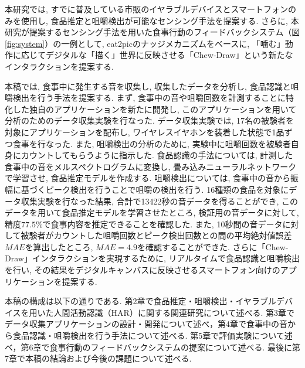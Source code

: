本研究では, すでに普及している市販のイヤラブルデバイスとスマートフォンのみを使用し, 食品推定と咀嚼検出が可能なセンシング手法を提案する. さらに, 本研究が提案するセンシング手法を用いた食事行動のフィードバックシステム（図\ref{fig:system}）の一例として, eat2picのナッジメカニズムをベースに, 「噛む」動作に応じてデジタルな「描く」世界に反映させる「Chew-Draw」という新たなインタラクションを提案する.

本稿では, 食事中に発生する音を収集し, 収集したデータを分析し, 食品認識と咀嚼検出を行う手法を提案する. まず, 食事中の音や咀嚼回数を計測することに特化した独自のアプリケーションを新たに開発し, このアプリケーションを用いて分析のためのデータ収集実験を行なった. データ収集実験では, 17名の被験者を対象にアプリケーションを配布し, ワイヤレスイヤホンを装着した状態で1品ずつ食事を行なった. また, 咀嚼検出の分析のために, 実験中に咀嚼回数を被験者自身にカウントしてもらうように指示した. 食品認識の手法については, 計測した食事中の音をメルスペクトログラムに変換し, 畳み込みニューラルネットワークで学習させ, 食品推定モデルを作成する. 咀嚼検出については, 食事中の音から振幅に基づくピーク検出を行うことで咀嚼の検出を行う. 16種類の食品を対象にデータ収集実験を行なった結果, 合計で13422秒の音データを得ることができ, このデータを用いて食品推定モデルを学習させたところ, 検証用の音データに対して, 精度$77.5\%$で食事内容を推定できることを確認した. また, 10秒間の音データに対して被験者がカウントした咀嚼回数とピーク検出回数との間の平均絶対値誤差$MAE$を算出したところ, $MAE = 4.9$を確認することができた. さらに「Chew-Draw」インタラクションを実現するために, リアルタイムで食品認識と咀嚼検出を行い, その結果をデジタルキャンバスに反映させるスマートフォン向けのアプリケーションを提案する.

本稿の構成は以下の通りである.
第2章で食品推定・咀嚼検出・イヤラブルデバイスを用いた人間活動認識（HAR）に関する関連研究について述べる. 第3章でデータ収集アプリケーションの設計・開発について述べ，第4章で食事中の音から食品認識・咀嚼検出を行う手法について述べる. 第5章で評価実験について述べ，第6章で食事行動のフィードバックシステムの提案について述べる. 最後に第7章で本稿の結論および今後の課題について述べる.

